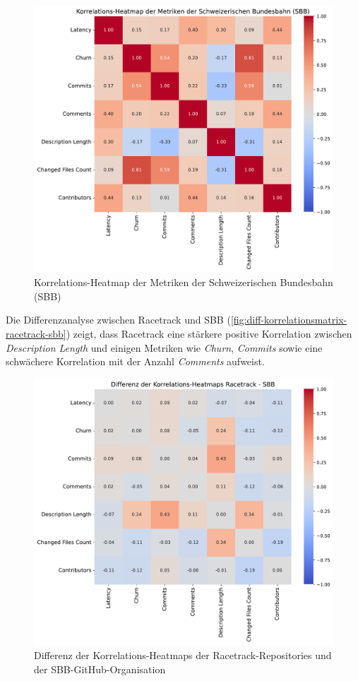 \begin{figure}[htbp]
    \includegraphics[width=\textwidth]{Figures/sbb-korrelationsmatrix.pdf}
    \caption{Korrelations-Heatmap der Metriken der Schweizerischen Bundesbahn (SBB)}
    \label{fig:korrelationsmatrix-sbb}
\end{figure}

\newpage
Die Differenzanalyse zwischen Racetrack und SBB (\autoref{fig:diff-korrelationsmatrix-racetrack-sbb}) zeigt, dass Racetrack eine stärkere positive Korrelation zwischen \textit{Description Length} und einigen Metriken wie \textit{Churn}, \textit{Commits} sowie eine schwächere Korrelation mit der Anzahl \textit{Comments} aufweist.

\begin{figure}[htbp]
\includegraphics[width=\textwidth]{Figures/diff-korrelationsmatrix-racetrack-sbb.pdf}
\caption{Differenz der Korrelations-Heatmaps der Racetrack-Repositories und der SBB-GitHub-Organisation}
\label{fig:diff-korrelationsmatrix-racetrack-sbb}
\end{figure}

